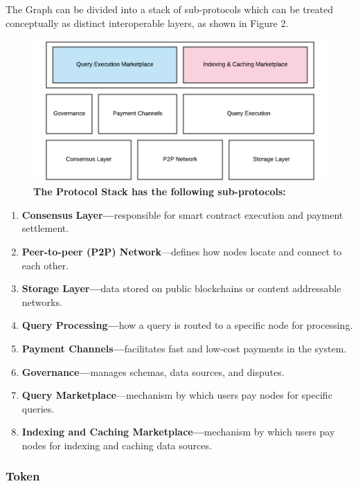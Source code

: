 \documentclass[12pt]{article}
\begin{document}
The Graph can be divided into a stack of sub-protocols which can be treated
conceptually as distinct interoperable layers, as shown in Figure 2.

\begin{figure}[H]
  \vspace*{5mm}
  \caption{\textbf{The Protocol Stack has the following sub-protocols:}}
  \begin{center}
    \includegraphics[width=.85\textwidth]{media/image7.png}
  \end{center}
\end{figure}

\begin{enumerate}
\item \textbf{Consensus} \textbf{Layer---}responsible for smart contract
  execution and payment settlement.
\item \textbf{Peer-to-peer (P2P) Network}---defines how nodes locate and connect
  to each other.
\item \textbf{Storage Layer---}data stored on public blockchains or content
  addressable networks.
\item \textbf{Query Processing---}how a query is routed to a specific node for
  processing.
\item \textbf{Payment Channels---}facilitates fast and low-cost payments in the
  system.
\item \textbf{Governance---}manages schemas, data sources, and disputes.
\item \textbf{Query Marketplace}---mechanism by which users pay nodes for
  specific queries.
\item \textbf{Indexing and Caching Marketplace---}mechanism by which users pay
  nodes for indexing and caching data sources.
\end{enumerate}

\subsubsection*{Token}
\end{document}
